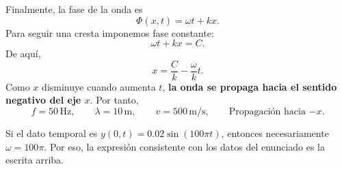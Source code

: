 \documentclass[11pt]{article}
\begin{document}
Finalmente, la fase de la onda es
\begin{equation*}
    \Phi(x,t)=\omega t+kx.
\end{equation*}
Para seguir una cresta imponemos fase constante:
\begin{equation*}
    \omega t+kx=C.
\end{equation*}
De aqu\'i,
\begin{equation*}
    x=\frac{C}{k}-\frac{\omega}{k}t.
\end{equation*}
Como $x$ disminuye cuando aumenta $t$, \textbf{la onda se propaga hacia el sentido negativo del eje $x$}. Por tanto,
\begin{equation*}
    \boxed{f=50\,\mathrm{Hz}},\qquad
    \boxed{\lambda=10\,\mathrm{m}},\qquad
    \boxed{v=500\,\mathrm{m/s}},\qquad
    \boxed{\text{Propagaci\'on hacia }{-x}}.
\end{equation*}


Si el dato temporal es $y(0,t)=0.02\sin(100\pi t)$, entonces necesariamente $\omega=100\pi$. Por eso, la expresi\'on consistente con los datos del enunciado es la escrita arriba.
\end{document}
